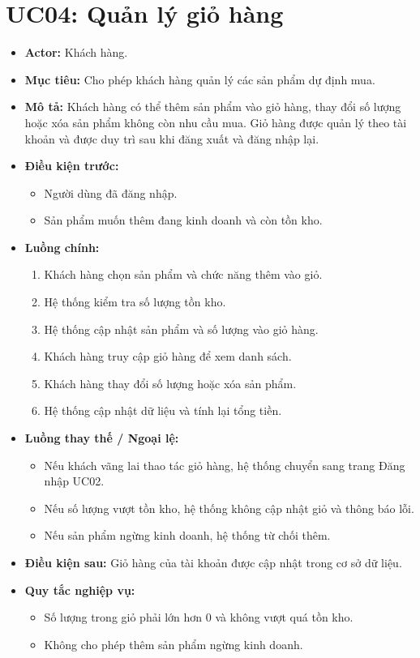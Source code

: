 \section{UC04: Quản lý giỏ hàng}
\begin{itemize}
    \item \textbf{Actor:} Khách hàng.
    \item \textbf{Mục tiêu:} Cho phép khách hàng quản lý các sản phẩm dự định mua.
    \item \textbf{Mô tả:} Khách hàng có thể thêm sản phẩm vào giỏ hàng, thay đổi số lượng hoặc xóa sản phẩm không còn nhu cầu mua. Giỏ hàng được quản lý theo tài khoản và được duy trì sau khi đăng xuất và đăng nhập lại.
    \item \textbf{Điều kiện trước:}
    \begin{itemize}
        \item Người dùng đã đăng nhập.
        \item Sản phẩm muốn thêm đang kinh doanh và còn tồn kho.
    \end{itemize}
    \item \textbf{Luồng chính:}
    \begin{enumerate}
        \item Khách hàng chọn sản phẩm và chức năng thêm vào giỏ.
        \item Hệ thống kiểm tra số lượng tồn kho.
        \item Hệ thống cập nhật sản phẩm và số lượng vào giỏ hàng.
        \item Khách hàng truy cập giỏ hàng để xem danh sách.
        \item Khách hàng thay đổi số lượng hoặc xóa sản phẩm.
        \item Hệ thống cập nhật dữ liệu và tính lại tổng tiền.
    \end{enumerate}
    \item \textbf{Luồng thay thế / Ngoại lệ:}
    \begin{itemize}
        \item Nếu khách vãng lai thao tác giỏ hàng, hệ thống chuyển sang trang Đăng nhập UC02.
        \item Nếu số lượng vượt tồn kho, hệ thống không cập nhật giỏ và thông báo lỗi.
        \item Nếu sản phẩm ngừng kinh doanh, hệ thống từ chối thêm.
    \end{itemize}
    \item \textbf{Điều kiện sau:} Giỏ hàng của tài khoản được cập nhật trong cơ sở dữ liệu.
    \item \textbf{Quy tắc nghiệp vụ:}
    \begin{itemize}
        \item Số lượng trong giỏ phải lớn hơn 0 và không vượt quá tồn kho.
        \item Không cho phép thêm sản phẩm ngừng kinh doanh.
    \end{itemize}
\end{itemize}

